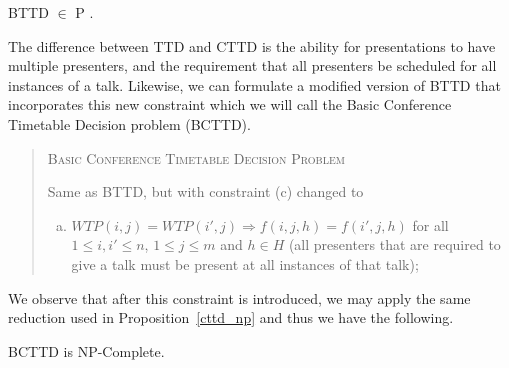 \documentclass{svjour3}                     %
\begin{document}
\begin{remark}
	BTTD $\in$ P \cite{lovelace2010}.
\end{remark}
The difference between TTD and CTTD is the ability for presentations to have multiple presenters, and the requirement that all presenters be scheduled for all instances of a talk. 
Likewise, we can formulate a modified version of BTTD that incorporates this new constraint which we will call the Basic Conference Timetable Decision problem (BCTTD). 
\begin{quote}
	\textsc{Basic Conference Timetable Decision Problem}
	
	Same as BTTD, but with constraint (c) changed to
	\begin{enumerate}[(c)]
		\item $WTP(i,j) = WTP(i',j) \Rightarrow f(i,j,h)=f(i',j,h)$ for all $1 \le i,i' \le n$, $1 \le j \le m$ and $h \in H$ (all presenters that are required to give a talk must be present at all instances of that talk);
	\end{enumerate}
\end{quote}

We observe that after this constraint is introduced, we may apply the same reduction used in Proposition~\ref{cttd_np} and thus we have the following.

\begin{proposition}\label{bcttd_np}
	BCTTD is NP-Complete.
\end{proposition}

\end{document}
